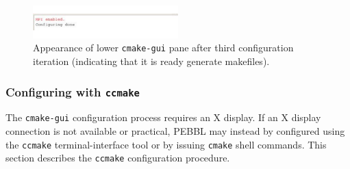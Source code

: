 \begin{figure}[tpb]
\begin{center}
\includegraphics[width=0.5\textwidth]{cmake5.pdf}
\vspace{-0.3in}
\end{center}{}
\caption{Appearance of lower \texttt{cmake-gui} pane after third
configuration iteration (indicating that it is ready generate makefiles).
  \label{fig:cmake5}}
\end{figure}

\subsubsection{Configuring with \texttt{ccmake}}
The \texttt{cmake-gui} configuration process requires an X display.  If an X
display connection is not available or practical, PEBBL may instead by
configured using the \texttt{ccmake} terminal-interface tool or by issuing
\texttt{cmake} shell commands.  This section describes the \texttt{ccmake}
configuration procedure.

